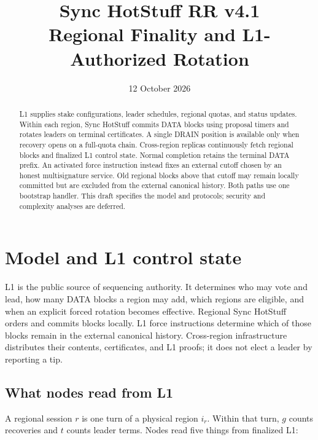 \documentclass[11pt,a4paper]{article}
\title{Sync HotStuff RR v4.1\\\large Regional Finality and L1-Authorized Rotation}
\author{}\date{12 October 2026}
\newcounter{protocol}
\begin{document}
\maketitle
\begin{abstract}
L1 supplies stake configurations, leader schedules, regional quotas, and
status updates. Within each region, Sync HotStuff commits DATA blocks
using proposal timers and rotates leaders on terminal certificates.
A single DRAIN position is available only when recovery opens on a
full-quota chain. Cross-region replicas continuously fetch regional
blocks and finalized L1 control state. Normal completion retains the
terminal DATA prefix. An activated force instruction instead fixes an
external cutoff chosen by an honest multisignature service. Old regional
blocks above that cutoff may remain locally committed but are excluded
from the external canonical history. Both paths use one bootstrap
handler. This draft specifies the model and protocols; security and
complexity analyses are deferred.
\end{abstract}

\section{Model and L1 control state}
\label{sec:model}
L1 is the public source of sequencing authority. It determines who may
vote and lead, how many DATA blocks a region may add, which regions are
eligible, and when an explicit forced rotation becomes effective.
Regional Sync HotStuff~\cite{sync} orders and commits blocks locally.
L1 force instructions determine which of those blocks remain in the
external canonical history.
Cross-region infrastructure distributes their contents, certificates, and
L1 proofs; it does not elect a leader by reporting a tip.

\subsection{What nodes read from L1}
\label{sec:l1}
A regional session $r$ is one turn of a physical region $i_r$.
Within that turn, $g$ counts recoveries and $t$ counts leader terms.
Nodes read five things from finalized L1:
\end{document}
